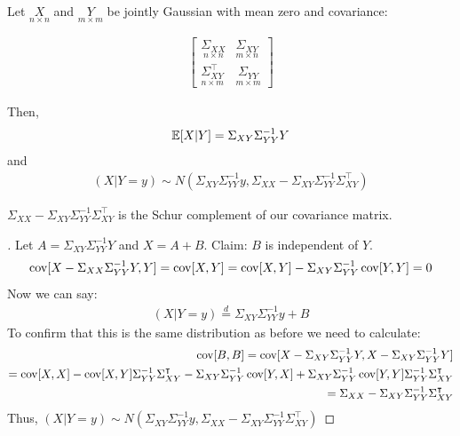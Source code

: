 \documentclass[../../../Master/AppliedStochastics.tex]{subfiles}
\begin{document}
\begin{lemma}
	Let $\underset{n\times n}{X}$ and $\underset{m\times m}{Y}$ be jointly Gaussian with mean zero and covariance: 

	$$\begin{aligned}
	\begin{bmatrix}
	\underset{n\times n}{\Sigma_{XX}} & \underset{m\times n}{\Sigma_{XY}} \\ 
	\underset{n\times m}{\Sigma_{XY}^\intercal}& \underset{m\times m}{\Sigma_{YY}}
	\end{bmatrix}
	\end{aligned}$$

Then, 
$$\begin{aligned}
	\mathbb{E}[X\vert Y] = \Sigma_{XY}\Sigma_{YY}^{-1} Y
\end{aligned}$$
and 
$$\begin{aligned}
(X\vert Y=y) \sim N(\Sigma_{XY}\Sigma_{YY}^{-1}y, \Sigma_{XX}-\Sigma_{XY}\Sigma_{YY}^{-1}\Sigma_{XY}^\intercal)
\end{aligned}$$
\begin{note}
	$\Sigma_{XX}-\Sigma_{XY}\Sigma_{YY}^{-1}\Sigma_{XY}^\intercal$ is the Schur complement of our covariance matrix.
\end{note}
\end{lemma}

\begin{proof}[]
	Let $A = \Sigma_{XY}\Sigma_{YY}^{-1}Y$ and $X = A+B$. 
	Claim: $B$ is independent of $Y$. 
		$$\begin{aligned}
		\operatorname{cov}[X-\Sigma_{XX}\Sigma_{YY}^{-1}Y,Y] = \operatorname{cov}[X,Y] 
		= \operatorname{cov}[X,Y]-\Sigma_{XY}\Sigma_{YY}^{-1}\operatorname{cov}[Y,Y]  
		= 0 
		\end{aligned}$$
	Now we can say: 
		$$\begin{aligned}
			(X\vert Y=y) \stackrel{d}{=} \Sigma_{XY}\Sigma_{YY}^{-1}y+B 
		\end{aligned}$$
	To confirm that this is the same distribution as before we need to calculate: 
		$$\begin{aligned}
		\operatorname{cov}[B,B] = \operatorname{cov}[X-\Sigma_{XY}\Sigma_{YY}^{-1}Y, X-\Sigma_{XY}\Sigma_{YY}^{-1}Y] \\
		= \operatorname{cov}[X,X] - \operatorname{cov}[X,Y]\Sigma_{YY}^{-1}\Sigma_{XY}^\intercal - \Sigma_{XY}\Sigma_{YY}^{-1}\operatorname{cov}[Y,X] + \Sigma_{XY}\Sigma_{YY}^{-1} \operatorname{cov}[Y,Y]\Sigma_{YY}^{-1}\Sigma_{XY}^\intercal \\= \Sigma_{XX}-\Sigma_{XY}\Sigma_{YY}^{-1}\Sigma_{XY}^\intercal
		\end{aligned}$$
	Thus, $(X\vert Y=y)\sim N(\Sigma_{XY}\Sigma_{YY}^{-1}y,  \Sigma_{XX}-\Sigma_{XY}\Sigma_{YY}^{-1}\Sigma_{XY}^\intercal)$
\end{proof}
\end{document}
